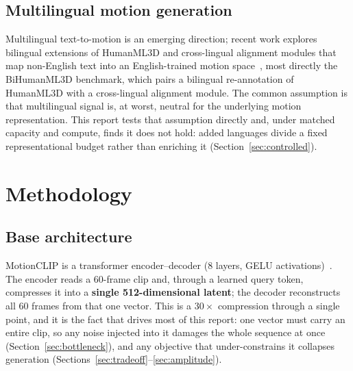 \documentclass[11pt,a4paper]{report}
\begin{document}
\section{Multilingual motion generation}

Multilingual text-to-motion is an emerging direction; recent work explores
bilingual extensions of HumanML3D and cross-lingual alignment modules that
map non-English text into an English-trained motion
space~\cite{weng2026bihumanml3d}, most directly the BiHumanML3D benchmark,
which pairs a bilingual re-annotation of HumanML3D with a cross-lingual
alignment module. The common
assumption is that multilingual signal is, at worst, neutral for the
underlying motion representation. This report tests that assumption
directly and, under matched capacity and compute, finds it does not hold:
added languages divide a fixed representational budget rather than
enriching it (Section~\ref{sec:controlled}).

\chapter{Methodology}
\label{ch:method}

\section{Base architecture}

MotionCLIP is a transformer encoder--decoder (8 layers, GELU
activations)~\cite{tevet2022motionclip,vaswani2017attention}. The encoder
reads a 60-frame clip and, through a learned query token, compresses it
into a \textbf{single 512-dimensional latent}; the decoder reconstructs all
60 frames from that one vector. This is a $30\times$ compression through a
single point, and it is the fact that drives most of this report: one
vector must carry an entire clip, so any noise injected into it damages the
whole sequence at once (Section~\ref{sec:bottleneck}), and any objective
that under-constrains it collapses generation
(Sections~\ref{sec:tradeoff}--\ref{sec:amplitude}).
\end{document}
